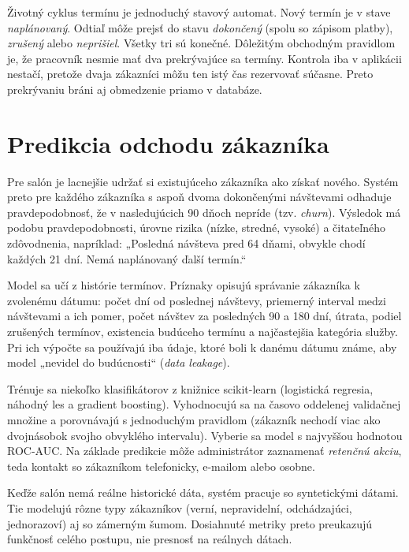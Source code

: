 Životný cyklus termínu je jednoduchý stavový automat. Nový termín je v stave \emph{naplánovaný}. Odtiaľ môže prejsť do stavu \emph{dokončený} (spolu so zápisom platby), \emph{zrušený} alebo \emph{neprišiel}. Všetky tri sú konečné. Dôležitým obchodným pravidlom je, že pracovník nesmie mať dva prekrývajúce sa termíny. Kontrola iba v aplikácii nestačí, pretože dvaja zákazníci môžu ten istý čas rezervovať súčasne. Preto prekrývaniu bráni aj obmedzenie priamo v databáze.

\section{Predikcia odchodu zákazníka}

Pre salón je lacnejšie udržať si existujúceho zákazníka ako získať nového. Systém preto pre každého zákazníka s aspoň dvoma dokončenými návštevami odhaduje pravdepodobnosť, že v nasledujúcich 90 dňoch nepríde (tzv. \emph{churn}). Výsledok má podobu pravdepodobnosti, úrovne rizika (nízke, stredné, vysoké) a čitateľného zdôvodnenia, napríklad: „Posledná návšteva pred 64 dňami, obvykle chodí každých 21 dní. Nemá naplánovaný ďalší termín.“

Model sa učí z histórie termínov. Príznaky opisujú správanie zákazníka k zvolenému dátumu: počet dní od poslednej návštevy, priemerný interval medzi návštevami a ich pomer, počet návštev za posledných 90 a 180 dní, útrata, podiel zrušených termínov, existencia budúceho termínu a najčastejšia kategória služby. Pri ich výpočte sa používajú iba údaje, ktoré boli k danému dátumu známe, aby model „nevidel do budúcnosti“ (\emph{data leakage}).

Trénuje sa niekoľko klasifikátorov z knižnice scikit-learn (logistická regresia, náhodný les a gradient boosting). Vyhodnocujú sa na časovo oddelenej validačnej množine a porovnávajú s jednoduchým pravidlom (zákazník nechodí viac ako dvojnásobok svojho obvyklého intervalu). Vyberie sa model s najvyššou hodnotou ROC-AUC. Na základe predikcie môže administrátor zaznamenať \emph{retenčnú akciu}, teda kontakt so zákazníkom telefonicky, e-mailom alebo osobne.

Keďže salón nemá reálne historické dáta, systém pracuje so syntetickými dátami. Tie modelujú rôzne typy zákazníkov (verní, nepravidelní, odchádzajúci, jednorazoví) aj so zámerným šumom. Dosiahnuté metriky preto preukazujú funkčnosť celého postupu, nie presnosť na reálnych dátach.
